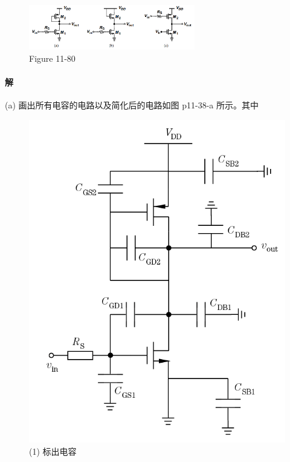 \documentclass[hyperref, UTF8]{ctexart}
\begin{document}
    \begin{figure}[!htb]
        \centering
        \includegraphics[width=0.646\textwidth]{p11-80.png}
        \caption*{Figure 11-80}
    \end{figure}

\paragraph{解}
    (a) 画出所有电容的电路以及简化后的电路如图 p11-38-a 所示。其中
    \begin{figure}[!htb]
        \centering
        \begin{minipage}[t]{0.397\textwidth}
        \centering
        \includegraphics[width=1\textwidth]{p11-38-a-sol1.png}
        \caption*{(1) 标出电容}
        \end{minipage}

\end{figure}
\end{document}
